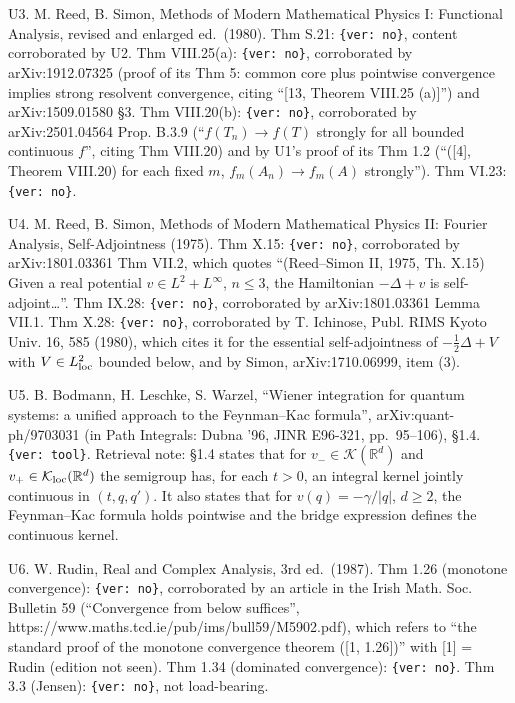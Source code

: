 \documentclass[11pt,a4paper]{article}
\begin{document}
U3. M. Reed, B. Simon, Methods of Modern Mathematical Physics I: Functional Analysis, revised and enlarged ed.~(1980). Thm S.21: \texttt{\{ver: no\}}, content corroborated by U2. Thm VIII.25(a): \texttt{\{ver: no\}}, corroborated by arXiv:1912.07325 (proof of its Thm 5: common core plus pointwise convergence implies strong resolvent convergence, citing ``{[}13, Theorem VIII.25 (a){]}'') and arXiv:1509.01580 §3. Thm VIII.20(b): \texttt{\{ver: no\}}, corroborated by arXiv:2501.04564 Prop. B.3.9 (``\(f(T_n)\to f(T)\) strongly for all bounded continuous \(f\)'', citing Thm VIII.20) and by U1's proof of its Thm 1.2 (``({[}4{]}, Theorem VIII.20) for each fixed \(m\), \(f_m(A_n)\to f_m(A)\) strongly''). Thm VI.23: \texttt{\{ver: no\}}.

U4. M. Reed, B. Simon, Methods of Modern Mathematical Physics II: Fourier Analysis, Self-Adjointness (1975). Thm X.15: \texttt{\{ver: no\}}, corroborated by arXiv:1801.03361 Thm VII.2, which quotes ``(Reed--Simon II, 1975, Th. X.15) Given a real potential \(v\in L^2+L^\infty\), \(n\le3\), the Hamiltonian \(-\Delta+v\) is self-adjoint\ldots{}''. Thm IX.28: \texttt{\{ver: no\}}, corroborated by arXiv:1801.03361 Lemma VII.1. Thm X.28: \texttt{\{ver: no\}}, corroborated by T. Ichinose, Publ. RIMS Kyoto Univ. 16, 585 (1980), which cites it for the essential self-adjointness of \(-\tfrac12\Delta+V\) with \(V\in L^2_{\rm loc}\) bounded below, and by Simon, arXiv:1710.06999, item (3).

U5. B. Bodmann, H. Leschke, S. Warzel, ``Wiener integration for quantum systems: a unified approach to the Feynman--Kac formula'', arXiv:quant-ph/9703031 (in Path Integrals: Dubna '96, JINR E96-321, pp.~95--106), §1.4. \texttt{\{ver: tool\}}. Retrieval note: §1.4 states that for \(v_-\in\mathcal K(\mathbb R^d)\) and \(v_+\in\mathcal K_{\rm loc}(\mathbb R^d)\) the semigroup has, for each \(t>0\), an integral kernel jointly continuous in \((t,q,q')\). It also states that for \(v(q)=-\gamma/|q|\), \(d\ge2\), the Feynman--Kac formula holds pointwise and the bridge expression defines the continuous kernel.

U6. W. Rudin, Real and Complex Analysis, 3rd ed.~(1987). Thm 1.26 (monotone convergence): \texttt{\{ver: no\}}, corroborated by an article in the Irish Math. Soc. Bulletin 59 (``Convergence from below suffices'', https://www.maths.tcd.ie/pub/ims/bull59/M5902.pdf), which refers to ``the standard proof of the monotone convergence theorem ({[}1, 1.26{]})'' with {[}1{]} = Rudin (edition not seen). Thm 1.34 (dominated convergence): \texttt{\{ver: no\}}. Thm 3.3 (Jensen): \texttt{\{ver: no\}}, not load-bearing.
\end{document}
